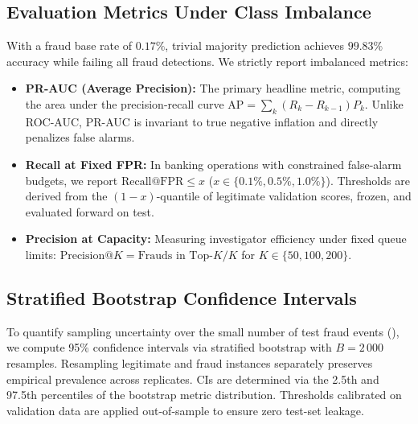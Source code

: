 
\subsection{Evaluation Metrics Under Class Imbalance}
\label{sec:eval:metrics}

With a fraud base rate of $0.17\%$, trivial majority prediction achieves $99.83\%$ accuracy while failing all fraud detections. We strictly report imbalanced metrics:
\begin{itemize}
    \item \textbf{PR-AUC (Average Precision):} The primary headline metric, computing the area under the precision-recall curve $\mathrm{AP} = \sum_k (R_k - R_{k-1}) P_k$. Unlike ROC-AUC, PR-AUC is invariant to true negative inflation and directly penalizes false alarms.
    \item \textbf{Recall at Fixed FPR:} In banking operations with constrained false-alarm budgets, we report $\text{Recall@FPR} \le x$ ($x \in \{0.1\%, 0.5\%, 1.0\%\}$). Thresholds are derived from the $(1-x)$-quantile of legitimate validation scores, frozen, and evaluated forward on test.
    \item \textbf{Precision at Capacity:} Measuring investigator efficiency under fixed queue limits: $\text{Precision@}K = \text{Frauds in Top-}K / K$ for $K \in \{50, 100, 200\}$.
\end{itemize}

\subsection{Stratified Bootstrap Confidence Intervals}
To quantify sampling uncertainty over the small number of test fraud events (\NFraudTest{}), we compute 95\% confidence intervals via stratified bootstrap with $B = 2\,000$ resamples. Resampling legitimate and fraud instances separately preserves empirical prevalence across replicates. CIs are determined via the 2.5th and 97.5th percentiles of the bootstrap metric distribution. Thresholds calibrated on validation data are applied out-of-sample to ensure zero test-set leakage.
